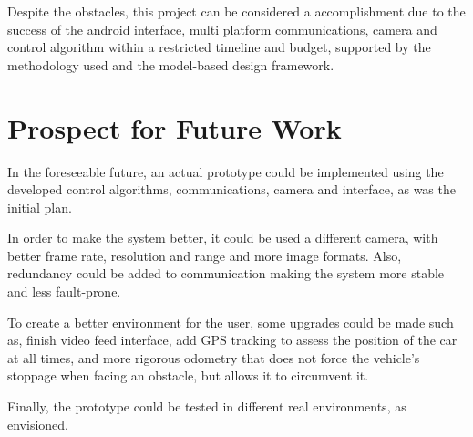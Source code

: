 Despite the obstacles, this project can be considered a accomplishment due to
the success of the android interface, multi platform communications, camera and
control algorithm within a restricted timeline and budget, supported by the
methodology used and the model-based design framework.
%
\section{Prospect for Future Work}%
\label{ch:conclusion-future-work}
In the foreseeable future, an actual prototype could be implemented using the
developed control algorithms, communications, camera and interface, as was the
initial plan.

In order to make the system better, it could be used a different camera, with
better frame rate, resolution and range and more image formats. Also, redundancy could be added to communication making the system more stable and less fault-prone. 

To create a better environment for the user, some upgrades could be made such
as, finish video feed interface, add \gls{GPS} tracking to assess the position of the car at all times, and more rigorous odometry that does not
force the vehicle's stoppage when facing an obstacle, but allows it to circumvent it.

Finally, the prototype could be tested in different real environments, as envisioned.
